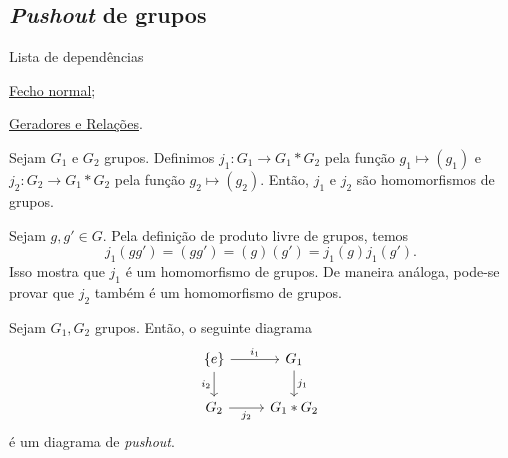 \subsection{\emph{Pushout} de grupos} %
\label{pushout-de-grupos-prop}
\begin{titlemize}{Lista de dependências}
	\item \hyperref[fecho-normal-def]{Fecho normal};\\
    \item \hyperref[geradores-relacoes-def]{Geradores e Relações}.%
\end{titlemize}

\begin{lemma}
    Sejam $G_1$ e $G_2$ grupos. Definimos $j_1:G_1\rightarrow G_1*G_2$ pela função $g_1\mapsto (g_1)$ e $j_2:G_2\rightarrow G_1*G_2$ pela função $g_2\mapsto (g_2)$. Então, $j_1$ e $j_2$ são homomorfismos de grupos.
\end{lemma}

\begin{dem}
    Sejam $g,g'\in G$. Pela definição de produto livre de grupos, temos 
    \[j_1(gg')=(gg')=(g)(g')=j_1(g)j_1(g').\]
    Isso mostra que $j_1$ é um homomorfismo de grupos. De maneira análoga, pode-se provar que $j_2$ também é um homomorfismo de grupos.
\end{dem}

\begin{prop}
    Sejam $G_1,G_2$ grupos. Então, o seguinte diagrama 
\[\begin{tikzcd}
	{\{e\}} & {G_1} \\
	{G_2} & {G_1*G_2}
	\arrow["{i_1}", from=1-1, to=1-2]
	\arrow["{i_2}"', from=1-1, to=2-1]
	\arrow["{j_1}", from=1-2, to=2-2]
	\arrow["{j_2}"', from=2-1, to=2-2]
\end{tikzcd}\]
é um diagrama de \emph{pushout}.
\end{prop}

